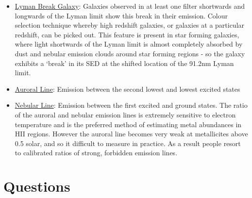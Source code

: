 \documentclass{literature}
\begin{document}
\begin{itemize}
\item \underline{Lyman Break Galaxy}: Galaxies observed in at least one filter shortwards and longwards of the Lyman limit show this break in their emission. Colour selection technique whereby high redshift galaxies, or galaxies at a particular redshift, can be picked out. This feature is present in star forming galaxies, where light shortwards of the Lyman limit is almost completely absorbed by dust and nebular emission clouds around star forming regions - so the galaxy exhibits a `break' in its SED at the shifted location of the 91.2nm Lyman limit.
\item \underline{Auroral Line}: Emission between the second lowest and lowest excited states 
\item \underline{Nebular Line}: Emission between the first excited and ground states. The ratio of the auroral and nebular emission lines is extremely sensitive to electron temperature and is the preferred method of estimating metal abundances in HII regions. However the auroral line becomes very weak at metallicites above 0.5 solar, and so it difficult to measure in practice. As a result people resort to calibrated ratios of strong, forbidden emission lines.  
\end{itemize}



\section{Questions}
\end{document}
